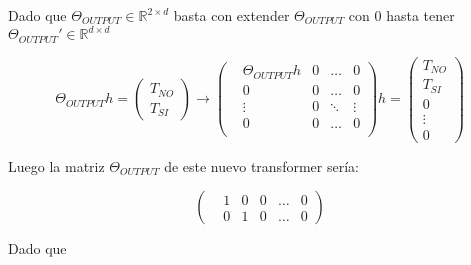 \documentclass{article}
\begin{document}
Dado que $\Theta_{OUTPUT} \in \mathbb{R}^{2\times d}$ basta con extender $\Theta_{OUTPUT}$ con $0$ hasta tener $\Theta_{OUTPUT}' \in \mathbb{R}^{d\times d}$


\begin{equation*}
    \Theta_{OUTPUT}h =   
    \left(\begin{matrix}
        T_{NO} \\
        T_{SI}
    \end{matrix}\right) \longrightarrow
    \left(\begin{matrix}
        &\Theta_{OUTPUT}h &0 &\dots  &0 \\
        &0                &0 &\dots  &0 \\
        &\vdots           &0 &\ddots &\vdots \\
        &0                &0 &\dots  &0 \\
    \end{matrix}\right)h = 
    \left(\begin{matrix}
        T_{NO} \\
        T_{SI} \\ 
        0 \\
        \vdots \\
        0
    \end{matrix}\right)
\end{equation*}


Luego la matriz $\Theta_{OUTPUT}$ de este nuevo transformer sería:

\begin{equation*}
    \left(\begin{matrix}
        &1 &0 &0 &\dots &0 \\
        &0 &1 &0 &\dots &0 
    \end{matrix}\right)
\end{equation*}

Dado que 
\end{document}
